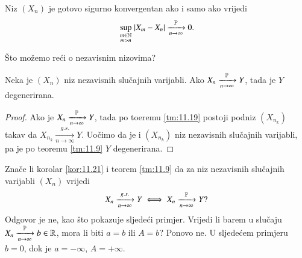 \begin{zad} \label{zad:11.20}
    Niz $(X_n)$ je gotovo sigurno konvergentan ako i samo ako vrijedi
    \begin{equation*}
        \sup\limits_{
            \begin{smallmatrix}
                m \in \mathbb{N}\\
                m > n
            \end{smallmatrix}
        } |X_m - X_n| \xrightarrow[n \to \infty]{\mathbb{P}} 0.
    \end{equation*}
\end{zad}

\v Sto mo\v zemo re\' ci o nezavisnim nizovima?

\begin{kor} \label{kor:11.21}
    Neka je $(X_n)$ niz nezavisnih slu\v cajnih varijabli.
    Ako $X_n \xrightarrow[n \to \infty]{\mathbb{P}} Y$, tada je $Y$ degenerirana.
\end{kor}

\begin{proof}
    Ako je $X_n \xrightarrow[n \to \infty]{\mathbb{P}} Y$, tada po toeremu \ref{tm:11.19} postoji podniz $(X_{n_k})$ takav da $X_{n_k} \xrightarrow[n \to \infty]{g.s.} Y$.
    Uo\v cimo da je i $(X_{n_k})$ niz nezavisnih slu\v cajnih varijabli, pa je po teoremu \ref{tm:11.9} $Y$ degenerirana.
\end{proof}

\begin{nap} \label{nap:11.22}
    Zna\v ce li korolar \ref{kor:11.21} i teorem \ref{tm:11.9} da za niz nezavisnih slu\v cajnih varijabli $(X_n)$ vrijedi
    \begin{equation*}
        X_n \xrightarrow[n \to \infty]{g.s.} Y \iff X_n \xrightarrow[n \to \infty]{\mathbb{P}} Y?
    \end{equation*}
    Odgovor je ne, kao \v sto pokazuje sljede\' ci primjer.
    Vrijedi li barem u slu\v caju $X_n \xrightarrow[n \to \infty]{\mathbb{P}} b \in \mathbb{R}$, mora li biti $a = b$ ili $A = b$?
    Ponovo ne. U sljede\' cem primjeru $b = 0$, dok je $a = -\infty$, $A = +\infty$.
\end{nap}

